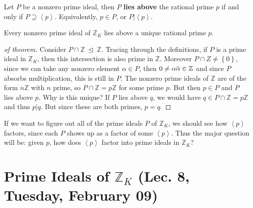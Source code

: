 \begin{definition}

Let \(P\) be a nonzero prime ideal, then \(P\) \textbf{lies above} the
rational prime \(p\) if and only if
\(P \supseteq \left\langle{ p }\right\rangle\). Equivalently,
\(p\in P\), or \(P\mathrel{\Big|}\left\langle{ p }\right\rangle\).

\end{definition}

\begin{theorem}

Every nonzero prime ideal of \({\mathbb{Z}}_K\) lies above a unique
rational prime \(p\).

\end{theorem}

\begin{proof}[of theorem]

Consider \(P \cap{\mathbb{Z}}{~\trianglelefteq~}{\mathbb{Z}}\). Tracing
through the definitions, if \(P\) is a prime ideal in
\({\mathbb{Z}}_K\), then this intersection is also prime in
\({\mathbb{Z}}\). Moreover \(P \cap Z \neq \left\{{ 0 }\right\}\), since
we can take any nonzero element \(\alpha \in P\), then
\(0\neq \alpha\mkern 1.5mu\overline{\mkern-1.5mu\alpha \mkern-1.5mu}\mkern 1.5mu\in {\mathbb{Z}}\)
and since \(P\) absorbs multiplication, this is still in \(P\). The
nonzero prime ideals of \({\mathbb{Z}}\) are of the form
\(n{\mathbb{Z}}\) with \(n\) prime, so
\(P \cap{\mathbb{Z}}= p{\mathbb{Z}}\) for some prime \(p\). But then
\(p\in P\) and \(P\) lies above \(p\). Why is this unique? If \(P\) lies
above \(q\), we would have \(q\in P \cap{\mathbb{Z}}= p {\mathbb{Z}}\)
and thus \(p\mathrel{\Big|}q\). But since these are both primes,
\(p=q\).

\end{proof}

\begin{remark}

If we want to figure out all of the prime ideals \(P\) of
\({\mathbb{Z}}_K\), we should see how \(\left\langle{ p }\right\rangle\)
factors, since each \(P\) shows up as a factor of some
\(\left\langle{ p }\right\rangle\). Thus the major question will be:
given \(p\), how does \(\left\langle{ p }\right\rangle\) factor into
prime ideals in \({\mathbb{Z}}_K\)?

\end{remark}

\hypertarget{prime-ideals-of-mathbbz_k-lec.-8-tuesday-february-09}{%
\section{\texorpdfstring{Prime Ideals of \({\mathbb{Z}}_K\) (Lec. 8,
Tuesday, February
09)}{Prime Ideals of \{\textbackslash mathbb\{Z\}\}\_K (Lec. 8, Tuesday, February 09)}}\label{prime-ideals-of-mathbbz_k-lec.-8-tuesday-february-09}}


